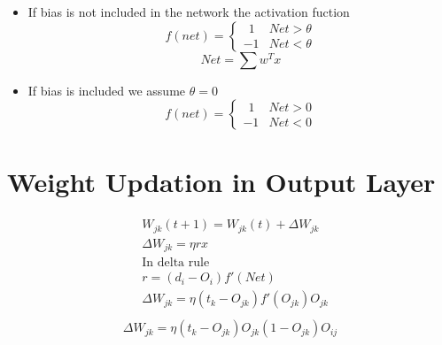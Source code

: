 \documentclass[12pt, right open]{memoir}
\newcommand{\matplus}{
~~
  }
\begin{document}
\begin{itemize}
\begin{figure}[ht!]
\end{figure}

\item If bias is not included in the network the activation fuction 
\[
f(net) = \begin{cases}
          \matplus1 & Net > \theta \\
          -1        & Net < \theta
          \end{cases}
\]
\[
Net = \sum w^Tx
\]
\item If bias is included we assume $\theta = 0$
\[
f(net) = \begin{cases}
          	\matplus1 & Net > 0 \\
          	-1 		  & Net < 0
          \end{cases}
\]
\end{itemize}

\section{Weight Updation in Output Layer}
\begin{align*}
& W_{jk}(t+1) = W_{jk}(t) + \Delta W_{jk}  \\ 
& \Delta W_{jk} = \eta r x  \\
& \text{In delta rule}  \\
& r = (d_i - O_i) f'(Net)  \\
& \Delta W_{jk}= \eta (t_k - O_{jk}) f' (O_{jk})O_{jk}  \\
\end{align*}
\begin{align}
\Delta W_{jk} = \eta (t_k - O_{jk}) O_{jk}(1-O_{jk})O_{ij}
\end{align}
\end{document}
